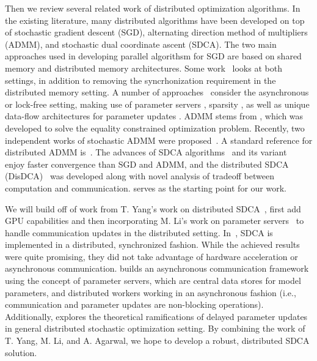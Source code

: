 \documentclass{article}
\begin{document}
Then we review several related work of distributed optimization algorithms. In
the existing literature, many distributed algorithms have been developed on top of
stochastic gradient descent (SGD), alternating direction method of multipliers
(ADMM), and stochastic dual coordinate ascent (SDCA). The two main approaches
used in developing parallel algorithsm for SGD are based on shared memory and
distributed memory architectures. Some work~\cite{lian2015asynchronous}
looks at both settings, in addition to removing the syncrhonization requirement
in the distributed memory setting.
A number of approaches~\cite{zinkevich2010parallelized,recht2011hogwild,agarwal2011distributed}
consider the asynchronous or lock-free setting, making use of parameter servers
\cite{li2014scaling}, sparsity \cite{recht2011hogwild}, as well as unique
data-flow architectures for parameter updates \cite{agarwal2011distributed}.
ADMM stems from \cite{gabay1976dual}, which was developed to solve the equality
constrained optimization problem. Recently, two independent works of stochastic
ADMM were proposed~\cite{ouyang2013stochastic,suzuki2013dual}. A standard
reference for distributed ADMM is~\cite{boyd2011distributed}. The advances of
SDCA algorithms~\cite{shalev2013stochastic} and its
variant~\cite{shalev2013accelerated,shalev2014accelerated,lin2014accelerated}
enjoy faster convergence than SGD and ADMM, and the distributed SDCA
(DisDCA)~\cite{yang2013trading,yang2013analysis} was developed along with novel
analysis of tradeoff between computation and communication. \cite{yang2013trading} serves as the starting point for our work.

We will build off of work from T. Yang's work on distributed SDCA~\cite{yang2013trading}, first add GPU capabilities and then incorporating M.
Li's work on parameter servers~\cite{li2014scaling} to handle communication
updates in the distributed setting.  In~\cite{yang2013trading}, SDCA is
implemented in a distributed, synchronized fashion. While the achieved results
were quite promising, they did not take advantage of hardware acceleration or
asynchronous communication.  \cite{li2014scaling} builds an asynchronous
communication framework using the concept of parameter servers, which are
central data stores for model parameters, and distributed workers working in an
asynchronous fashion (i.e., communication and parameter updates are non-blocking
operations).  Additionally,
\cite{agarwal2011distributed} explores the
theoretical ramifications of delayed parameter updates in general distributed
stochastic optimization setting. By combining the work
of T. Yang, M. Li, and A. Agarwal, we hope to develop a robust,
distributed SDCA solution.
\end{document}
